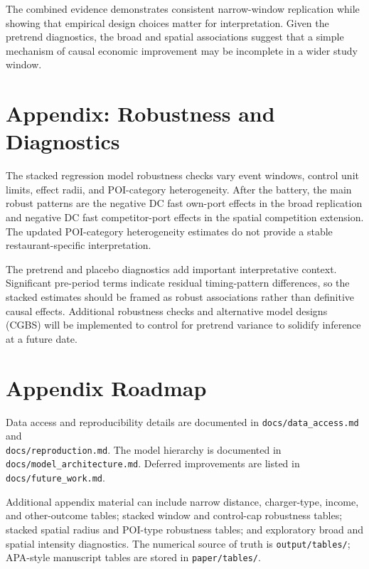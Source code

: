 \documentclass[12pt]{article}
\begin{document}
The combined evidence demonstrates consistent narrow-window replication while showing that empirical design choices matter for interpretation. Given the pretrend diagnostics, the broad and spatial associations suggest that a simple mechanism of causal economic improvement may be incomplete in a wider study window.

\appendix

\FloatBarrier

\section{Appendix: Robustness and Diagnostics}

The stacked regression model robustness checks vary event windows, control unit limits, effect radii, and POI-category heterogeneity. After the battery, the main robust patterns are the negative DC fast own-port effects in the broad replication and negative DC fast competitor-port effects in the spatial competition extension. The updated POI-category heterogeneity estimates do not provide a stable restaurant-specific interpretation.

The pretrend and placebo diagnostics add important interpretative context. Significant pre-period terms indicate residual timing-pattern differences, so the stacked estimates should be framed as robust associations rather than definitive causal effects. Additional robustness checks and alternative model designs (CGBS) will be implemented to control for pretrend variance to solidify inference at a future date.





\FloatBarrier

\section{Appendix Roadmap}

Data access and reproducibility details are documented in \texttt{docs/data\_access.md} and \\ \texttt{docs/reproduction.md}. The model hierarchy is documented in \texttt{docs/model\_architecture.md}. Deferred improvements are listed in \texttt{docs/future\_work.md}.

Additional appendix material can include narrow distance, charger-type, income, and other-outcome tables; stacked window and control-cap robustness tables; stacked spatial radius and POI-type robustness tables; and exploratory broad and spatial intensity diagnostics. The numerical source of truth is \texttt{output/tables/}; APA-style manuscript tables are stored in \texttt{paper/tables/}.
\end{document}
